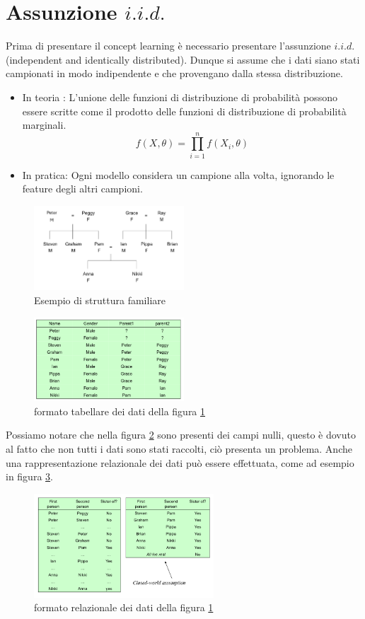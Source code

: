 \section{Assunzione $i.i.d.$}
Prima di presentare il concept learning è necessario presentare l'assunzione $i.i.d.$ (independent and identically distributed).
Dunque si assume che i dati siano stati campionati in modo indipendente e che provengano dalla stessa distribuzione.
\begin{itemize}
		\item 
		In teoria : L'unione delle funzioni di distribuzione di probabilità possono essere scritte come il prodotto delle funzioni di distribuzione di probabilità marginali.
		\[
		f(X,\theta)=\prod_{i=1}^n f(X_i,\theta)
		\]
	\item 
		In pratica: Ogni modello considera un campione alla volta, ignorando le feature degli altri campioni.
\end{itemize}
\begin{figure}[h]
	\centering
	\includegraphics[width=0.5\textwidth]{pictures/familyTree.png}
	\caption{Esempio di struttura familiare}
	\label{fig:iid}
\end{figure}
\begin{figure}
	\centering
	\includegraphics[width=0.5\textwidth]{pictures/familyTable.png}
	\caption{formato tabellare dei dati della figura \ref{fig:iid}}
	\label{fig:iid2}
\end{figure}
Possiamo notare che nella figura \ref{fig:iid2} sono presenti dei campi nulli, questo è dovuto al fatto che non tutti i dati sono stati raccolti, ciò presenta un problema.
Anche una rappresentazione relazionale dei dati può essere effettuata, come ad esempio in figura \ref{fig:iid3}.
\begin{figure}
	\centering
	\includegraphics[width=0.6\textwidth]{pictures/familyRel.png}
	\caption{formato relazionale dei dati della figura \ref{fig:iid}}
	\label{fig:iid3}
\end{figure}
